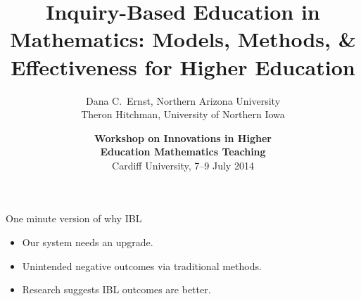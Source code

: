 \documentclass[10pt]{beamer}
\begin{document}


\title[Inquiry-Based Education in Mathematics]
{\large \textbf{Inquiry-Based Education in Mathematics: Models, Methods, \& Effectiveness for Higher Education}}
\author[D.C.~Ernst and TJ Hitchman]{Dana C.~Ernst, Northern Arizona University\\
Theron Hitchman, University of Northern Iowa}

\vspace{1em}

\date{\textbf{Workshop on Innovations in Higher\\ Education Mathematics Teaching}\\
Cardiff University, 7--9 July 2014}

\frame{\titlepage}


\begin{frame}

\vfill
\begin{center}
\end{center}
\vfill

\end{frame}


\begin{frame}

\begin{block}{One minute version of why IBL}
\begin{itemize}
\item<2-> Our system needs an upgrade.
\item<3-> Unintended negative outcomes via traditional methods.
\item<4-> Research suggests IBL outcomes are better.
\end{itemize}
\end{block}

\vspace{1em}


%

\end{frame}
\end{document}
